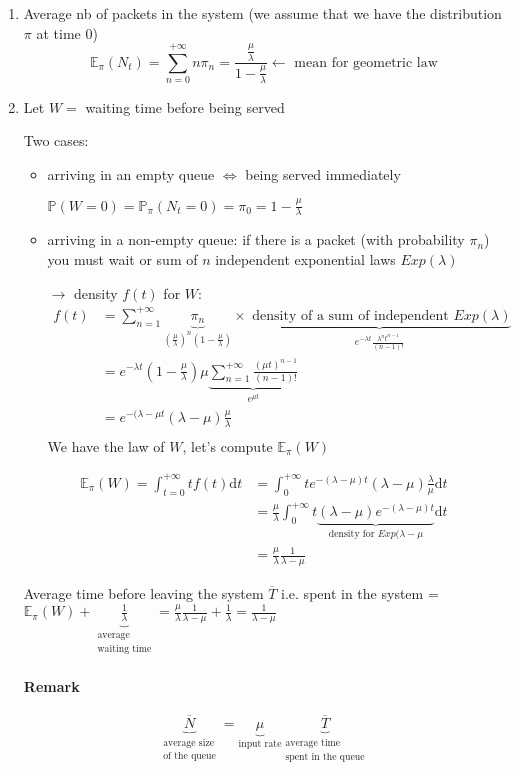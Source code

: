 \documentclass{article}
\newcommand{\deriv}{\mathrm{d}}
\begin{document}
\begin{enumerate}
\item Average nb of packets in the system (we assume that we have the distribution $\pi$ at time 0)
\[\mathbb{E}_{\pi}(N_t)=\sum_{n=0}^{+\infty} n \pi_n = \frac{\frac{\mu}{\lambda}}{1-\frac{\mu}{\lambda}} \leftarrow \text{ mean for geometric law}\]
\item Let $W=$ waiting time before being served

Two cases:
\begin{itemize}
\item arriving in an empty queue $\Leftrightarrow$ being served immediately

$\mathbb{P}(W=0)=\mathbb{P}_\pi(N_t=0)=\pi_0=1-\frac{\mu}{\lambda}$
\item arriving in a non-empty queue: if there is a packet (with probability $\pi_n$) you must wait or sum of $n$ independent exponential laws $Exp(\lambda)$

$\to$ density $f(t)$ for $W$:
\begin{align*}
f(t) & =\sum_{n=1}^{+\infty} \underbrace{\pi_n}_{\left(\frac{\mu}{\lambda}\right)^n \left(1-\frac{\mu}{\lambda}\right)}\times \underbrace{\text{ density of a sum of independent } Exp(\lambda)}_{e^{-\lambda t}\frac{\lambda^nt^{n-1}}{(n-1)!}}\\
& = e^{- \lambda t}\left( 1 - \frac{\mu}{\lambda}\right) \mu \underbrace{\sum_{n=1}^{+\infty} \frac{(\mu t)^{n-1}}{(n-1)!}}_{e^{\mu t}}\\
& = e^{-(\lambda - \mu t}(\lambda - \mu)\frac{\mu}{\lambda}\\
\end{align*}
We have the law of $W$, let's compute $\mathbb{E}_\pi (W)$
\end{itemize}

\begin{align*}
\mathbb{E}_\pi(W) = \int_{t=0}^{+\infty} t f(t) \deriv t & = \int_{0}^{+\infty}t e^{-(\lambda-\mu)t}(\lambda - \mu)\frac{\lambda}{\mu}\deriv t\\
& = \frac{\mu}{\lambda}\int_0^{+\infty}t\underbrace{(\lambda - \mu)e^{-(\lambda-\mu)t}}_{\text{density for $Exp(\lambda-\mu$}}\deriv t\\
& = \frac{\mu}{\lambda}\frac{1}{\lambda-\mu}
\end{align*}

Average time before leaving the system $\overline{T}$ i.e. spent in the system = $\mathbb{E}_\pi(W)+\underbrace{\frac{1}{\lambda}}_{\substack{\text{average}\\\text{waiting time}}} = \frac{\mu}{\lambda}\frac{1}{\lambda - \mu}+\frac{1}{\lambda}=\frac{1}{\lambda-\mu}$

\paragraph{Remark}
\[\underbrace{\overline{N}}_{\substack{\text{average size}\\\text{of the queue}}}=\underbrace{\mu}_{\text{input rate}} \underbrace{\overline{T}}_{\substack{\text{average time}\\\text{spent in the queue}}}
\tag{Little's law}\]
\end{enumerate}
\end{document}
